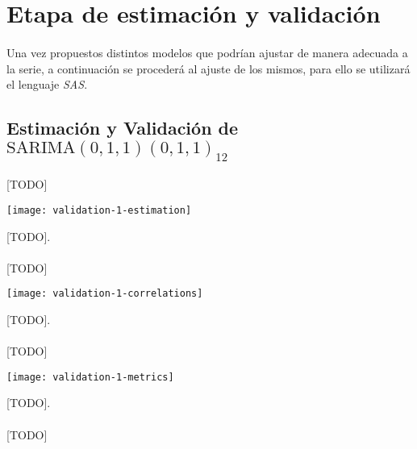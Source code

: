 \documentclass[a4paper, spanish]{article}
\begin{document}
  \section{Etapa de estimación y validación}
  \label{sec:fitting}

    \paragraph{}
    Una vez propuestos distintos modelos que podrían ajustar de manera adecuada a la serie, a continuación se procederá al ajuste de los mismos, para ello se utilizará el lenguaje \emph{SAS}.


    \subsection{Estimación y Validación de \textbf{$\text{SARIMA}(0, 1, 1)(0, 1, 1)_{12}$}}
    \label{sec:fitting_1}

      \paragraph{}
      [TODO]

      \begin{table}[htb!]
        \centering
        \texttt{[image: validation-1-estimation]}
        \caption{[TODO].}
        \label{}
      \end{table}

      \paragraph{}
      [TODO]

      \begin{table}[htb!]
        \centering
        \texttt{[image: validation-1-correlations]}
        \caption{[TODO].}
        \label{}
      \end{table}

      \paragraph{}
      [TODO]

      \begin{table}[htb!]
        \centering
        \texttt{[image: validation-1-metrics]}
        \caption{[TODO].}
        \label{}
      \end{table}

      \paragraph{}
      [TODO]
\end{document}
